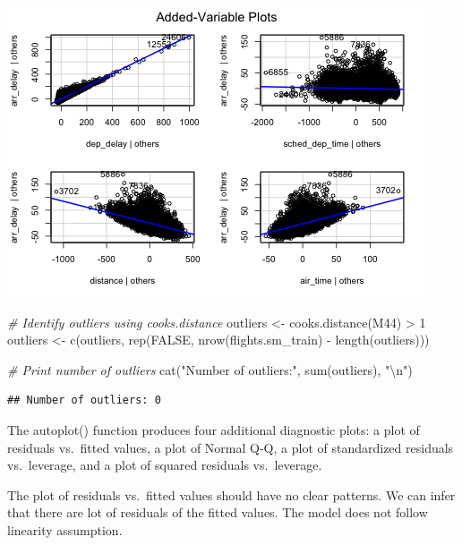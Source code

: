 \documentclass[
]{article}
\newenvironment{Shaded}{\begin{snugshade}}{\end{snugshade}}
\newcommand{\CommentTok}[1]{\textcolor[rgb]{0.56,0.35,0.01}{\textit{#1}}}
\newcommand{\ConstantTok}[1]{\textcolor[rgb]{0.00,0.00,0.00}{#1}}
\newcommand{\DecValTok}[1]{\textcolor[rgb]{0.00,0.00,0.81}{#1}}
\newcommand{\FunctionTok}[1]{\textcolor[rgb]{0.00,0.00,0.00}{#1}}
\newcommand{\NormalTok}[1]{#1}
\newcommand{\OtherTok}[1]{\textcolor[rgb]{0.56,0.35,0.01}{#1}}
\newcommand{\SpecialCharTok}[1]{\textcolor[rgb]{0.00,0.00,0.00}{#1}}
\newcommand{\StringTok}[1]{\textcolor[rgb]{0.31,0.60,0.02}{#1}}
\begin{document}
\includegraphics{HW3-Trinath-Sai-Subhash-Reddy-Pittala_files/figure-latex/unnamed-chunk-10-2.png}

\begin{Shaded}
\begin{Highlighting}[]
\CommentTok{\# Identify outliers using cooks.distance}
\NormalTok{outliers }\OtherTok{\textless{}{-}} \FunctionTok{cooks.distance}\NormalTok{(M44) }\SpecialCharTok{\textgreater{}} \DecValTok{1}
\NormalTok{outliers }\OtherTok{\textless{}{-}} \FunctionTok{c}\NormalTok{(outliers, }\FunctionTok{rep}\NormalTok{(}\ConstantTok{FALSE}\NormalTok{, }\FunctionTok{nrow}\NormalTok{(flights.sm\_train) }\SpecialCharTok{{-}} \FunctionTok{length}\NormalTok{(outliers)))}


\CommentTok{\# Print number of outliers}
\FunctionTok{cat}\NormalTok{(}\StringTok{"Number of outliers:"}\NormalTok{, }\FunctionTok{sum}\NormalTok{(outliers), }\StringTok{"}\SpecialCharTok{\textbackslash{}n}\StringTok{"}\NormalTok{)}
\end{Highlighting}
\end{Shaded}

\begin{verbatim}
## Number of outliers: 0
\end{verbatim}

The autoplot() function produces four additional diagnostic plots: a
plot of residuals vs.~fitted values, a plot of Normal Q-Q, a plot of
standardized residuals vs.~leverage, and a plot of squared residuals
vs.~leverage.

The plot of residuals vs.~fitted values should have no clear patterns.
We can infer that there are lot of residuals of the fitted values. The
model does not follow linearity assumption.
\end{document}
